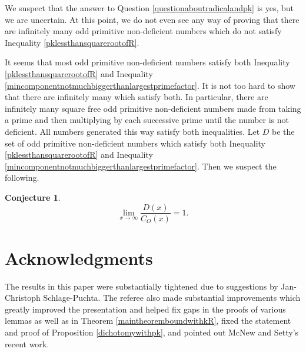\documentclass[12pt,reqno]{article}
\theoremstyle{plain}
\theoremstyle{definition}
\newtheorem{conjecture}[theorem]{Conjecture}
\theoremstyle{remark}
\begin{document}
We suspect that the answer to Question \ref{questionaboutradicalandpk} is yes, but we are uncertain. At this point, we do not even see any way of proving that there are infinitely many odd primitive non-deficient numbers which do not satisfy  Inequality \eqref{pklessthansquarerootofR}.

It seems that most odd primitive non-deficient numbers satisfy both Inequality \eqref{pklessthansquarerootofR} and Inequality \eqref{mincomponentnotmuchbiggerthanlargestprimefactor}. It is not too hard to show that there are infinitely many which satisfy both. In particular, there are infinitely many square free odd primitive non-deficient numbers made from taking a prime and then multiplying by each successive prime until the number is not deficient. All numbers generated this way satisfy both inequalities.  Let $D$ be the set of odd primitive non-deficient numbers which satisfy both Inequality \eqref{pklessthansquarerootofR} and Inequality \eqref{mincomponentnotmuchbiggerthanlargestprimefactor}. Then we suspect the following. \begin{conjecture}
$$\lim_{x \rightarrow \infty} \frac{D(x)}{C_O(x)}=1.$$
\end{conjecture}


\section{Acknowledgments}The results in this paper were substantially tightened due to suggestions by Jan-Christoph Schlage-Puchta. The referee also made substantial improvements which greatly improved the presentation and helped fix gaps in the proofs of various lemmas as well as in Theorem \ref{maintheoremboundwithkR}, fixed the statement and proof of Proposition \ref{dichotomywithpk}, and pointed out McNew and Setty's recent work. 
\end{document}
